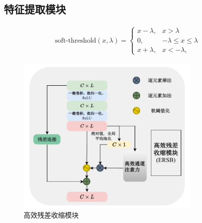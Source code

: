 

\subsection{特征提取模块}\label{sec:background}

\begin{equation}
    \begin{aligned}
            \text{soft-threshold}(x, \lambda) = \begin{cases}
            x - \lambda, & x > \lambda \\
            0, & -\lambda \leq x \leq \lambda \\
            x + \lambda, & x < -\lambda,
            \end{cases}
        \end{aligned}
    \label{equ: soft}
\end{equation}

\begin{figure}
\centering
\includegraphics[width=0.8\textwidth]{Image/fem.pdf}
\caption{高效残差收缩模块}
\label{fig:fem}
\end{figure}

